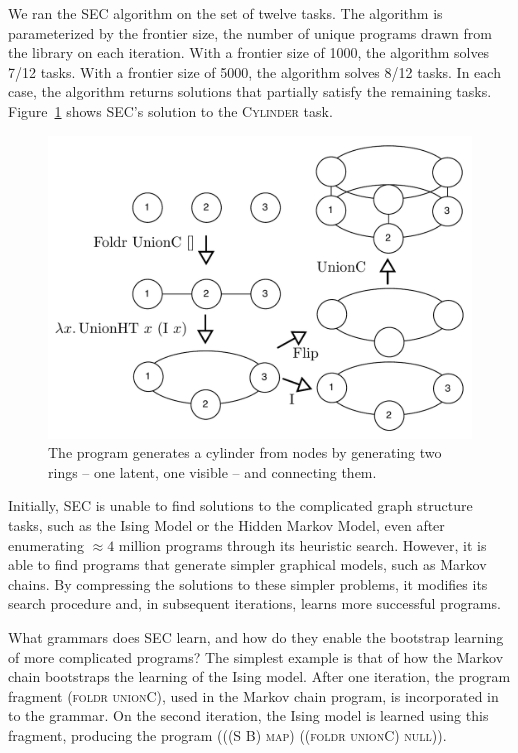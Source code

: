 \documentclass{article} %
\begin{document}
We ran the SEC algorithm on the set of twelve tasks. The algorithm is parameterized by the frontier size, the number of unique programs drawn from the library on each iteration. %
With a frontier size of 1000, the algorithm solves 7/12 tasks. With a frontier size of 5000, the algorithm solves 8/12 tasks. In each case, the algorithm returns solutions that partially satisfy the remaining tasks. Figure~\ref{ref:cylinder} shows SEC's solution to the \textsc{Cylinder} task. 
\begin{figure}
\includegraphics[width=\linewidth]{./figures/cylinder.pdf}
\caption{The program generates a cylinder from nodes by generating two rings -- one latent, one visible -- and connecting them.\label{ref:cylinder}}
\end{figure}
Initially, SEC is unable to find solutions to the complicated graph structure tasks, such as the Ising Model or the Hidden Markov Model, even after enumerating $\approx 4$ million programs through its heuristic search.
However, it is able to find programs that generate simpler graphical models, such as Markov chains.
By compressing the solutions to these simpler problems, it modifies its search procedure and, in subsequent iterations, learns more successful programs.

What grammars does SEC learn, and how do they enable the bootstrap learning of more complicated programs?
The simplest example is that of how the Markov chain bootstraps the learning of the Ising model.
After one iteration, the program fragment \textsc{(foldr unionC)}, used in the Markov chain program, is incorporated in to the grammar.
On the second iteration, the Ising model is learned using this fragment, producing the program
\textsc{(((S B) map) ((foldr unionC) null))}.
\end{document}
